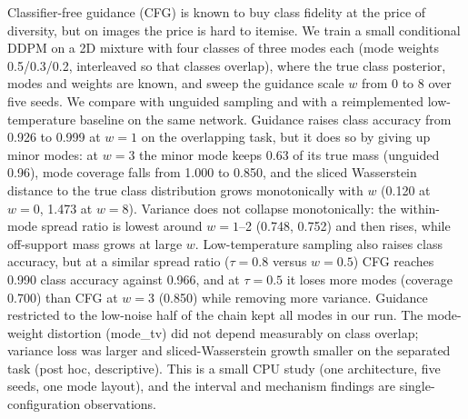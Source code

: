 Classifier-free guidance (CFG) is known to buy class fidelity at the price of diversity, but on images the price is hard to itemise. We train a small conditional DDPM on a 2D mixture with four classes of three modes each (mode weights 0.5/0.3/0.2, interleaved so that classes overlap), where the true class posterior, modes and weights are known, and sweep the guidance scale $w$ from 0 to 8 over five seeds. We compare with unguided sampling and with a reimplemented low-temperature baseline on the same network. Guidance raises class accuracy from 0.926 to 0.999 at $w=1$ on the overlapping task, but it does so by giving up minor modes: at $w=3$ the minor mode keeps 0.63 of its true mass (unguided 0.96), mode coverage falls from 1.000 to 0.850, and the sliced Wasserstein distance to the true class distribution grows monotonically with $w$ (0.120 at $w=0$, 1.473 at $w=8$). Variance does not collapse monotonically: the within-mode spread ratio is lowest around $w=1$--2 (0.748, 0.752) and then rises, while off-support mass grows at large $w$. Low-temperature sampling also raises class accuracy, but at a similar spread ratio ($\tau=0.8$ versus $w=0.5$) CFG reaches 0.990 class accuracy against 0.966, and at $\tau=0.5$ it loses more modes (coverage 0.700) than CFG at $w=3$ (0.850) while removing more variance. Guidance restricted to the low-noise half of the chain kept all modes in our run. The mode-weight distortion (mode\_tv) did not depend measurably on class overlap; variance loss was larger and sliced-Wasserstein growth smaller on the separated task (post hoc, descriptive). This is a small CPU study (one architecture, five seeds, one mode layout), and the interval and mechanism findings are single-configuration observations.
